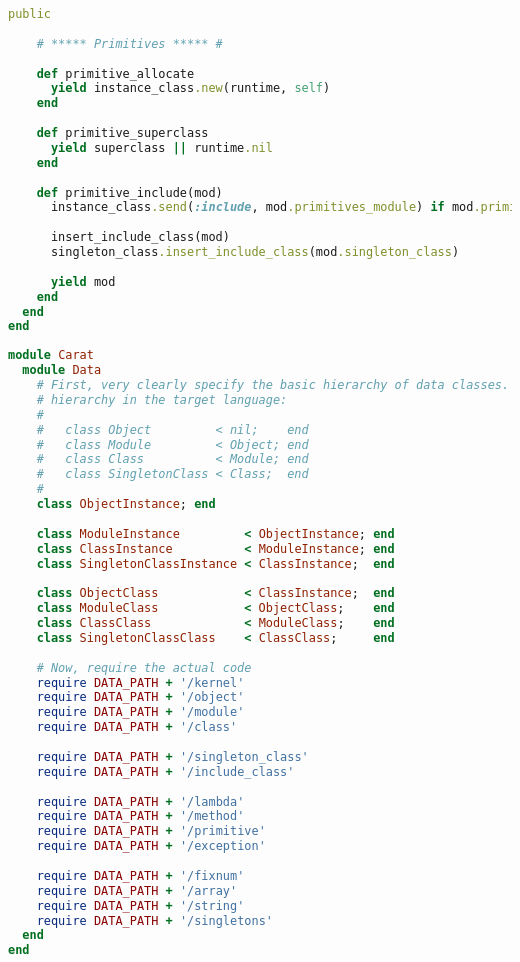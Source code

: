\begin{lstlisting}[title={\small\Helvetica data/class.rb},language=Ruby]
    public
    
    # ***** Primitives ***** #
    
    def primitive_allocate
      yield instance_class.new(runtime, self)
    end
    
    def primitive_superclass
      yield superclass || runtime.nil
    end
    
    def primitive_include(mod)
      instance_class.send(:include, mod.primitives_module) if mod.primitives_module
      
      insert_include_class(mod)
      singleton_class.insert_include_class(mod.singleton_class)
      
      yield mod
    end
  end
end

\end{lstlisting}
\begin{lstlisting}[title={\small\Helvetica data/data.rb},language=Ruby]
module Carat
  module Data
    # First, very clearly specify the basic hierarchy of data classes. This mirrors the inheritance
    # hierarchy in the target language:
    # 
    #   class Object         < nil;    end
    #   class Module         < Object; end
    #   class Class          < Module; end
    #   class SingletonClass < Class;  end
    # 
    class ObjectInstance; end
    
    class ModuleInstance         < ObjectInstance; end
    class ClassInstance          < ModuleInstance; end
    class SingletonClassInstance < ClassInstance;  end
    
    class ObjectClass            < ClassInstance;  end
    class ModuleClass            < ObjectClass;    end
    class ClassClass             < ModuleClass;    end
    class SingletonClassClass    < ClassClass;     end
    
    # Now, require the actual code
    require DATA_PATH + '/kernel'
    require DATA_PATH + '/object'
    require DATA_PATH + '/module'
    require DATA_PATH + '/class'
    
    require DATA_PATH + '/singleton_class'
    require DATA_PATH + '/include_class'
    
    require DATA_PATH + '/lambda'
    require DATA_PATH + '/method'
    require DATA_PATH + '/primitive'
    require DATA_PATH + '/exception'
    
    require DATA_PATH + '/fixnum'
    require DATA_PATH + '/array'
    require DATA_PATH + '/string'
    require DATA_PATH + '/singletons'
  end
end

\end{lstlisting}

